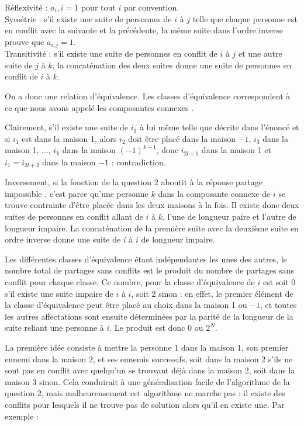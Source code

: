 \Q
Réflexivité : $a_i,i=1$ pour tout $i$ par convention.\\
Symétrie : s'il existe une suite de personnes de $i$ à $j$ telle que chaque personne est en conflit avec la suivante et la précédente, la même suite dans l'ordre inverse prouve que $a_{i,j}=1$.\\
Transitivité : s'il existe une suite de personnes en conflit de $i$ à $j$ et une autre suite de $j$ à $k$, la concaténation des deux suites donne une suite de personnes en conflit de $i$ à $k$.
\medskip

On a donc une relation d'équivalence. Les classes d'équivalence correspondent à ce que nous avons appelé les \og composantes connexes \fg{}.
\medskip

Clairement, s'il existe une suite de $i_1$ à lui même telle que décrite dans l'énoncé et si $i_1$ est dans la maison 1, alors $i_2$ doit être placé dans la maison $-1$, $i_3$ dans la maison 1, ..., $i_k$ dans la maison $(-1)^{k-1}$, donc $i_{2l+1}$ dans la maison 1 et $i_1=i_{2l+2}$ dans la maison $-1$ : contradiction.
\medskip

Inversement, si la fonction de la question 2 aboutit à la réponse \og partage impossible \fg{}, c'est parce qu'une personne $k$ dans la composante connexe de $i$ se trouve contrainte d'être placée dans les deux maisons à la fois. Il existe donc deux suites de personnes en conflit allant de $i$ à $k$, l'une de longueur paire et l'autre de longueur impaire. La concaténation de la première suite avec la deuxième suite en ordre inverse donne une suite de $i$ à $i$ de longueur impaire.
\medskip

Les différentes classes d'équivalence étant indépendantes les unes des autres, le nombre total de partages sans conflits est le produit du nombre de partages sans conflit pour chaque classe. Ce nombre, pour la classe d'équivalence de $i$ est soit 0 s'il existe une suite impaire de $i$ à $i$, soit 2 sinon : en effet, le premier élément de la classe d'équivalence peut être placé au choix dans la maison 1 ou $-1$, et toutes les autres affectations sont ensuite déterminées par la parité de la longueur de la suite reliant une personne à $i$. Le produit est donc 0 ou $2^N$.

\Q
La première idée consiste à mettre la personne 1 dans la maison 1, son premier ennemi dans la maison 2, et ses ennemis successifs, soit dans la maison 2 s'ils ne sont pas en conflit avec quelqu'un se trouvant déjà dans la maison 2, soit dans la maison 3 sinon. Cela conduirait à une généralisation facile de l'algorithme de la question 2, mais malheureusement cet algorithme ne marche pas : il existe des conflits pour lesquels il ne trouve pas de solution alors qu'il en existe une. Par exemple :
\medskip

